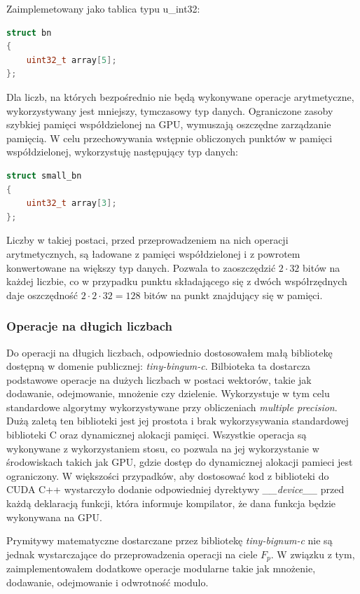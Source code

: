 Zaimplemetowany jako tablica typu u\_int32:
\begin{lstlisting}[language=C++]
struct bn
{
    uint32_t array[5];
};
\end{lstlisting}
Dla liczb, na których bezpośrednio nie będą wykonywane operacje arytmetyczne, wykorzystywany jest mniejszy, tymczasowy typ
danych.
Ograniczone zasoby szybkiej pamięci współdzielonej na GPU, wymuszają oszczędne zarządzanie pamięcią. W celu
przechowywania wstępnie obliczonych punktów w pamięci współdzielonej, wykorzystuję następujący typ danych:
\begin{lstlisting}[language=C++]
struct small_bn
{
    uint32_t array[3];
};
\end{lstlisting}
\par
Liczby w takiej postaci, przed przeprowadzeniem na nich operacji arytmetycznych, są ładowane z pamięci współdzielonej i z powrotem konwertowane na większy typ danych.
Pozwala to zaoszczędzić $ 2 \cdot 32$ bitów na każdej liczbie, co w przypadku punktu składającego się z dwóch współrzędnych
daje oszczędność $2 \cdot 2 \cdot 32 = 128$ bitów na punkt znajdujący się w pamięci.

\subsubsection{Operacje na długich liczbach}
Do operacji na długich liczbach, odpowiednio dostosowałem małą bibliotekę
dostępną w domenie publicznej: \textit{tiny-bingum-c}.
Bilbioteka ta dostarcza podstawowe operacje na dużych liczbach w postaci wektorów, takie jak dodawanie, odejmowanie, mnożenie czy dzielenie.
Wykorzystuje w tym celu standardowe algorytmy \cite{Menezes2001} wykorzystywane przy obliczeniach \textit{multiple precision}.
Dużą zaletą ten biblioteki jest jej prostota i brak wykorzysywania standardowej biblioteki C oraz dynamicznej alokacji pamięci.
Wszystkie operacja są wykonywane z wykorzystaniem stosu,
co pozwala na jej wykorzystanie w środowiskach takich jak GPU, gdzie dostęp do dynamicznej alokacji pamieci jest ograniczony.
W większości przypadków, aby dostosować kod z biblioteki do CUDA C++ wystarczyło dodanie
odpowiedniej dyrektywy \textit{\_\_device\_\_} przed każdą deklaracją funkcji, która informuje kompilator, że dana funkcja
będzie wykonywana na GPU.
\par
Prymitywy matematyczne dostarczane przez bibliotekę \textit{tiny-bignum-c} nie są jednak wystarczające do przeprowadzenia
operacji na ciele $F_{p}$.
W związku z tym, zaimplementowałem dodatkowe operacje modularne takie jak mnożenie, dodawanie, odejmowanie i odwrotność modulo.

